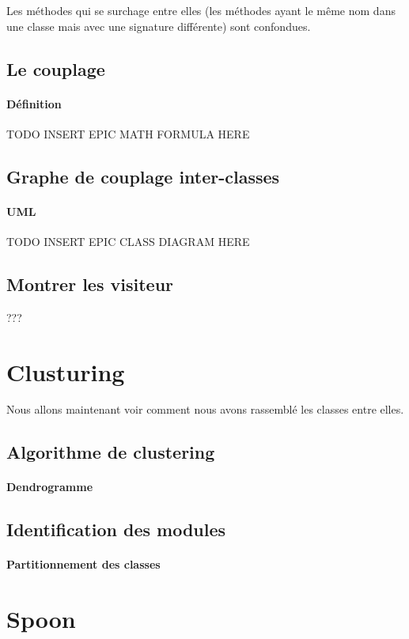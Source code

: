 \documentclass[a4paper]{article}
\begin{document}
\begin{multicols}{2}
        Les méthodes qui se surchage entre elles (les méthodes ayant le même nom dans une classe mais avec une signature différente) sont confondues.
        \subsection{Le couplage}
        \paragraph{Définition} TODO INSERT EPIC MATH FORMULA HERE 
        \subsection{Graphe de couplage inter-classes}

        \paragraph{UML} TODO INSERT EPIC CLASS DIAGRAM HERE 
        \subsection{Montrer les visiteur}
        ???
        \section{Clusturing}
        Nous allons maintenant voir comment nous avons rassemblé les classes entre elles. 
        \subsection{Algorithme de clustering}
        \paragraph{Dendrogramme}
        \subsection{Identification des modules}
        \paragraph{Partitionnement des classes}
        \section{Spoon}
    \end{multicols}
\end{document}
